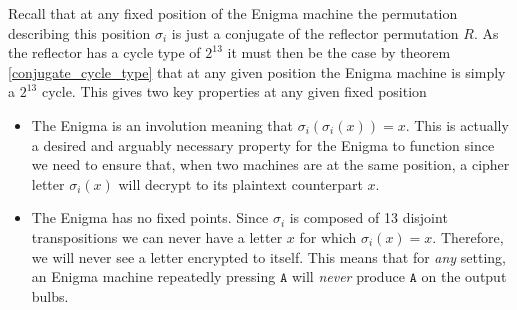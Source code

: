 Recall that at any fixed position of the Enigma machine the
permutation describing this position $\sigma_i$ is just a conjugate
of the reflector permutation $R$. As the reflector has a cycle type
of $2^{13}$ it must then be the case by theorem
\ref{conjugate_cycle_type} that at any given position the Enigma
machine is simply a $2^{13}$ cycle. This gives two key properties at
any given fixed position
\begin{itemize}
	\item The Enigma is an involution meaning that $\sigma_i(\sigma_i(x))
		      = x$. This is actually a desired and arguably necessary property for
	      the Enigma to function since we need to ensure that, when two
	      machines are at the same position, a cipher letter $\sigma_i(x)$ will
	      decrypt to its plaintext counterpart $x$.
	\item The Enigma has no fixed points. Since $\sigma_i$ is composed of
	      13 disjoint transpositions we can never have a letter $x$ for which
	      $\sigma_i(x) = x$. Therefore, we will never see a letter encrypted to
	      itself. This means that for \emph{any} setting, an Enigma machine
	      repeatedly pressing $\texttt{A}$ will \emph{never} produce
	      $\texttt{A}$ on the output bulbs.
\end{itemize}


